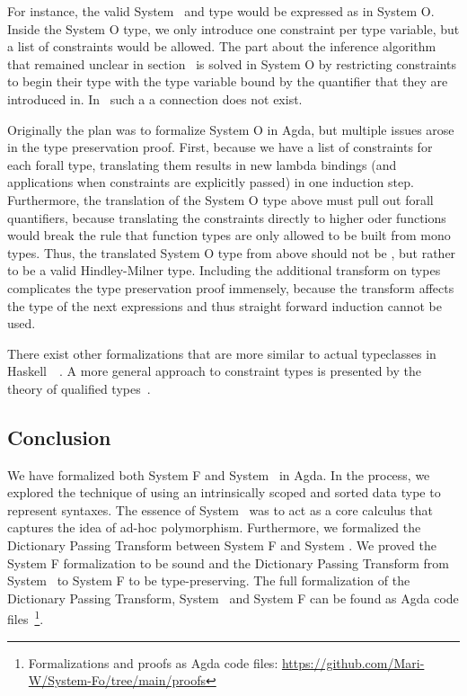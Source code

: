 \noindent For instance, the valid System \Fo\ and \HMo type  would be expressed as  in System O. 
Inside the System O type, we only introduce one constraint per type variable, but a list of constraints would be allowed. 
The part about the inference algorithm that remained unclear in section~\cite{sec:hm} is solved in System O by restricting constraints to begin their type with the type variable bound by the quantifier that they are introduced in. 
In \HMo\ such a a connection does not exist.

\noindent Originally the plan was to formalize System O in Agda, but multiple issues arose in the type preservation proof. 
First, because we have a list of  constraints for each forall type, translating them results in  new lambda bindings (and  applications when constraints are explicitly passed) in one induction step. 
Furthermore, the translation of the System O type above must pull out forall quantifiers, because translating the constraints directly to higher oder functions would break the rule that function types are only allowed to be built from mono types. 
Thus, the translated System O type from above should not be , but rather  to be a valid Hindley-Milner type. 
Including the additional transform on types complicates the type preservation proof immensely, because the transform affects the type of the next  expressions and thus straight forward induction cannot be used.

\noindent There exist other formalizations that are more similar to actual typeclasses in Haskell~\cite{ahp}~\cite{tc}. A more general approach to constraint types is presented by the theory of qualified types~\cite{qt}.

\subsection{Conclusion}
We have formalized both System F and System \Fo\ in Agda.
In the process, we explored the technique of using an intrinsically scoped and sorted data type to represent syntaxes.
The essence of System \Fo\ was to act as a core calculus that captures the idea of ad-hoc polymorphism.
Furthermore, we formalized the Dictionary Passing Transform between System F and System \Fo. 
We proved the System F formalization to be sound and the Dictionary Passing Transform from System \Fo\ to System F to be type-preserving. 
The full formalization of the Dictionary Passing Transform, System \Fo\ and  System F can be found as Agda code files~\footnote{Formalizations and proofs as Agda code files: \url{https://github.com/Mari-W/System-Fo/tree/main/proofs}}. 

